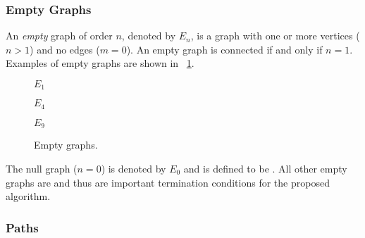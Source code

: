\subsubsection{Empty Graphs}\label{sec:sub:sub:empty}

An \emph{empty} graph of order \(n\), denoted by \(E_n\), is a graph with one or more vertices (\(n>1\)) and no
edges (\(m=0\)).  An empty graph is connected if and only if \(n=1\).  Examples of empty graphs are shown in
\figurename~\ref{fig:empty}.

\begin{figure}[H]
  \begin{minipage}{1in}
    \centering

    \bigskip

    \(E_1\)
  \end{minipage}
  \begin{minipage}{2.5in}
    \centering

    \bigskip

    \(E_4\)
  \end{minipage}
  \begin{minipage}{2in}
    \centering

    \bigskip

    \(E_9\)
  \end{minipage}
  \caption{Empty graphs.}
  \label{fig:empty}
\end{figure}

The null graph (\(n=0\)) is denoted by \(E_0\) and is defined to be .  All other empty graphs are
 and thus are important termination conditions for the proposed algorithm.

\subsubsection{Paths}\label{sec:sub:sub:paths}

